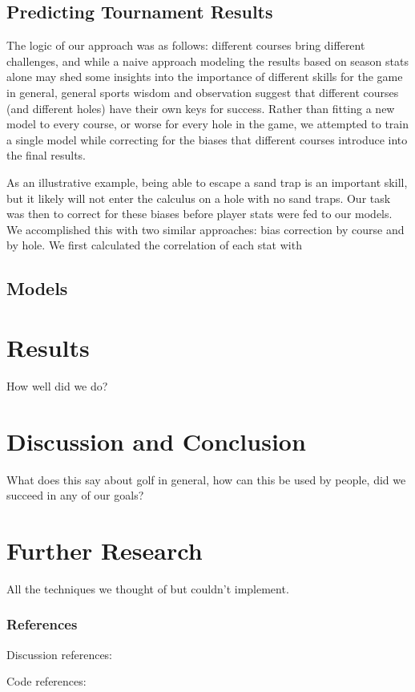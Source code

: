 \documentclass[margin = 0.5in] {article}%
\begin{document}
\subsection{Predicting Tournament Results}
The logic of our approach was as follows: different courses bring different challenges, and while a naive approach modeling the results based on season stats alone may shed some insights into the importance of different skills for the game in general, general sports wisdom and observation suggest that different courses (and different holes) have their own keys for success.  Rather than fitting a new model to every course, or worse for every hole in the game, we attempted to train a single model while correcting for the biases that different courses introduce into the final results. 

As an illustrative example, being able to escape a sand trap is an important skill, but it likely will not enter the calculus on a hole with no sand traps.  Our task was then to correct for these biases before player stats were fed to our models.  We accomplished this with two similar approaches: bias correction by course and by hole.  We first calculated the correlation of each stat with 

\subsection{Models}

\section{Results}
How well did we do? 

\section{Discussion and Conclusion}
What does this say about golf in general, how can this be used by people, did we succeed in any of our goals?


\section{Further Research}
All the techniques we thought of but couldn't implement.

\clearpage

\subsubsection*{References}

Discussion references:


Code references:
\end{document}
